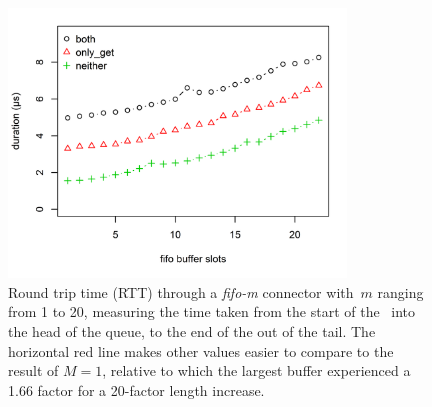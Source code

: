 \begin{figure}
	\centering
	\includegraphics[width=0.80\textwidth]{experiments/fifo_m.png}
	\caption[RTT for fifo-M connector with $2^13$ byte values.]{Round trip time (RTT) through a \textit{fifo-m} connector with~$m$ ranging from 1 to 20, measuring the time taken from the start of the~ into the head of the queue, to the end of the  out of the tail. The horizontal red line makes other values easier to compare to the result of $M=1$, relative to which the largest buffer experienced a 1.66 factor for a 20-factor length increase.}
	\label{fig:fifo_m}
\end{figure}